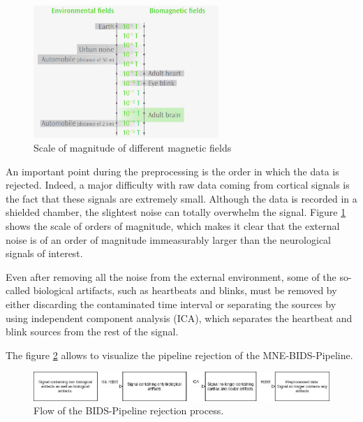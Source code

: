 \begin{figure}[ht]
    \centering
    \includegraphics[width=7cm]{images_report/sensor/noise_order_of_magnitude.png}
    \caption[Scale of magnitude of different magnetic fields]%
    {Scale of magnitude of different magnetic fields}
    \label{noise_order_of_magnitude}
\end{figure}


An important point during the preprocessing is the order in which the data is rejected. Indeed, a major difficulty with raw data coming from cortical signals is the fact that these signals are extremely small. Although the data is recorded in a shielded chamber, the slightest noise can totally overwhelm the signal. Figure \ref{noise_order_of_magnitude} shows the scale of orders of magnitude, which makes it clear that the external noise is of an order of magnitude immeasurably larger than the neurological signals of interest.

Even after removing all the noise from the external environment, some of the so-called biological artifacts, such as heartbeats and blinks, must be removed by either discarding the contaminated time interval or separating the sources by using independent component analysis (ICA), which separates the heartbeat and blink sources from the rest of the signal.

The figure \ref{rejection_pipeline} allows to visualize the pipeline rejection of the MNE-BIDS-Pipeline.

\begin{figure}[ht]
    \centering
    \includegraphics[width=15cm]{images_report/preprocessing/rejection_pipeline.png}
    \caption[Simplification of the BIDS-Pipeline rejection process.]%
    {Flow of the BIDS-Pipeline rejection process.}
    \label{rejection_pipeline}
\end{figure}

